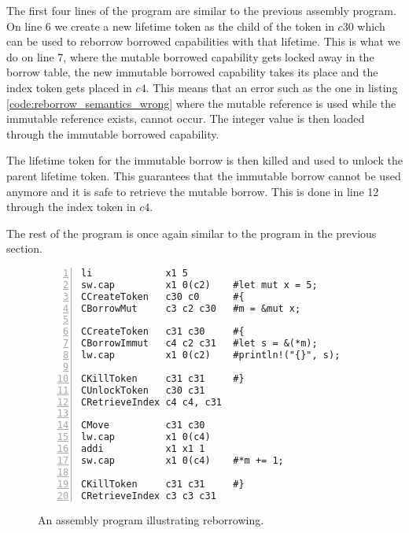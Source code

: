 The first four lines of the program are similar to the previous assembly program.
On line 6 we create a new lifetime token as the child of the token in $c30$ which can be used to reborrow borrowed capabilities with that lifetime.
This is what we do on line 7, where the mutable borrowed capability gets locked away in the borrow table, the new immutable borrowed capability takes its place and the index token gets placed in $c4$.
This means that an error such as the one in listing \ref{code:reborrow_semantics_wrong} where the mutable reference is used while the immutable reference exists, cannot occur.
The integer value is then loaded through the immutable borrowed capability.

The lifetime token for the immutable borrow is then killed and used to unlock the parent lifetime token.
This guarantees that the immutable borrow cannot be used anymore and it is safe to retrieve the mutable borrow.
This is done in line 12 through the index token in $c4$.

The rest of the program is once again similar to the program in the previous section.
\begin{figure}[h]
\begin{lstlisting}[style=custASM, numbers = left ,xleftmargin=1.5em]
li             x1 5
sw.cap         x1 0(c2)    #let mut x = 5;
CCreateToken   c30 c0      #{
CBorrowMut     c3 c2 c30   #m = &mut x;

CCreateToken   c31 c30     #{
CBorrowImmut   c4 c2 c31   #let s = &(*m);
lw.cap         x1 0(c2)    #println!("{}", s);

CKillToken     c31 c31     #}
CUnlockToken   c30 c31
CRetrieveIndex c4 c4, c31

CMove          c31 c30
lw.cap         x1 0(c4)
addi           x1 x1 1
sw.cap         x1 0(c4)    #*m += 1;

CKillToken     c31 c31     #}
CRetrieveIndex c3 c3 c31
\end{lstlisting}
\caption{An assembly program illustrating reborrowing.}
\label{fig:asmreborrowexample}
\end{figure}

